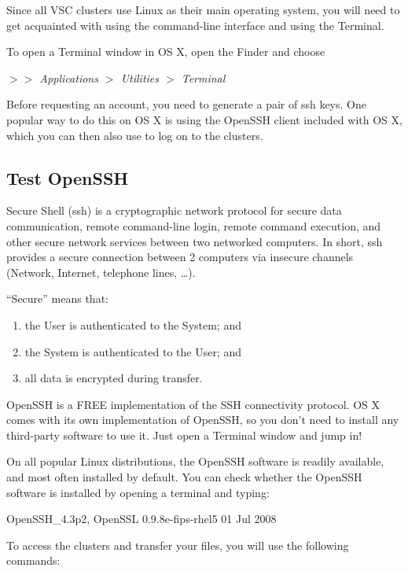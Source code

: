   Since all VSC clusters use Linux as their main operating system, you will
  need to get acquainted with using the command-line interface and using the
  Terminal.

  To open a Terminal window in OS X, open the Finder and choose

  \emph{$>$$>$ Applications $>$ Utilities $>$ Terminal}

  Before requesting an account, you need to generate a pair of ssh keys. One
  popular way to do this on OS X is using the OpenSSH client included with OS
  X, which you can then also use to log on to the clusters.

  \subsection{Test OpenSSH}
  \label{sec:test-openssh}

  Secure Shell (ssh) is a cryptographic network protocol for secure data
  communication, remote command-line login, remote command execution, and other
  secure network services between two networked computers. In short, ssh
  provides a secure connection between 2 computers via insecure channels
  (Network, Internet, telephone lines, \ldots).

  ``Secure'' means that:

  \begin{enumerate}
    \item  the User is authenticated to the System; and
    \item  the System is authenticated to the User; and
    \item  all data is encrypted during transfer.
  \end{enumerate}

  OpenSSH is a FREE implementation of the SSH connectivity protocol. OS X comes
  with its own implementation of OpenSSH, so you don't need to install any
  third-party software to use it. Just open a Terminal window and jump in!

  On all popular Linux distributions, the OpenSSH software is readily
  available, and most often installed by default. You can check whether the
  OpenSSH software is installed by opening a terminal and typing:

\begin{prompt}
OpenSSH_4.3p2, OpenSSL 0.9.8e-fips-rhel5 01 Jul 2008
\end{prompt}

  To access the clusters and transfer your files, you will use the following commands:

